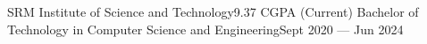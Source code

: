 \hTable
{SRM Institute of Science and Technology}{9.37 CGPA (Current)}
{Bachelor of Technology in Computer Science and Engineering}{Sept 2020 --- Jun 2024}